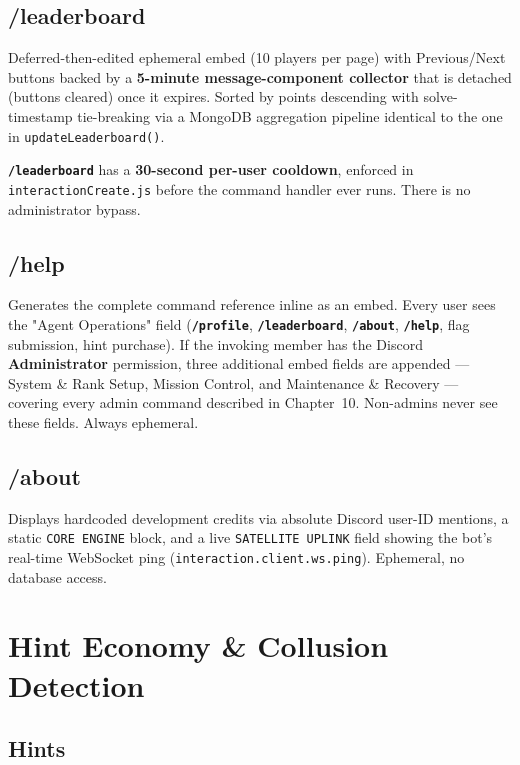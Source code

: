 \documentclass[12pt,a4paper]{report}
\newcommand{\cmd}[1]{\texttt{\color{cybercyan}\textbf{#1}}}
\newcommand{\note}[1]{
    \begin{tcolorbox}[colback=cyberblue!5, colframe=cyberblue,
        title=\textbf{NOTE}, fonttitle=\sffamily\small]
    #1
    \end{tcolorbox}
}
\begin{document}
\section{/leaderboard}

Deferred-then-edited ephemeral embed (10 players per page) with Previous/Next buttons backed by a
\textbf{5-minute message-component collector} that is detached (buttons cleared) once it expires.
Sorted by points descending with solve-timestamp tie-breaking via a MongoDB aggregation pipeline
identical to the one in \texttt{updateLeaderboard()}.

\note{\cmd{/leaderboard} has a \textbf{30-second per-user cooldown}, enforced in
\texttt{interactionCreate.js} before the command handler ever runs. There is no administrator
bypass.}

\section{/help}

Generates the complete command reference inline as an embed. Every user sees the "Agent
Operations" field (\cmd{/profile}, \cmd{/leaderboard}, \cmd{/about}, \cmd{/help}, flag submission,
hint purchase). If the invoking member has the Discord \textbf{Administrator} permission, three
additional embed fields are appended --- System \& Rank Setup, Mission Control, and Maintenance \&
Recovery --- covering every admin command described in Chapter~10. Non-admins never see these
fields. Always ephemeral.

\section{/about}

Displays hardcoded development credits via absolute Discord user-ID mentions, a static
\texttt{CORE ENGINE} block, and a live \texttt{SATELLITE UPLINK} field showing the bot's real-time
WebSocket ping (\texttt{interaction.client.ws.ping}). Ephemeral, no database access.

\newpage
\chapter{Hint Economy \& Collusion Detection}

\section{Hints}
\end{document}
